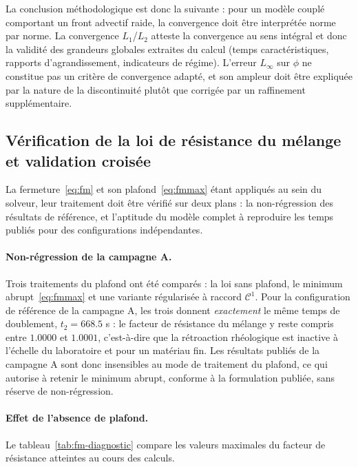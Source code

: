 \documentclass[11pt,a4paper]{report}
\begin{document}
La conclusion méthodologique est donc la suivante : pour un modèle couplé comportant un front advectif
raide, la convergence doit être interprétée norme par norme. La convergence \(L_1\)/\(L_2\) atteste la
convergence au sens intégral et donc la validité des grandeurs globales extraites du calcul (temps
caractéristiques, rapports d'agrandissement, indicateurs de régime). L'erreur \(L_\infty\) sur \(\phi\) ne
constitue pas un critère de convergence adapté, et son ampleur doit être expliquée par la nature de la
discontinuité plutôt que corrigée par un raffinement supplémentaire.

\subsection{Vérification de la loi de résistance du mélange et validation croisée}
\label{sec:verif-fm}

La fermeture~\eqref{eq:fm} et son plafond~\eqref{eq:fmmax} étant appliqués au sein du solveur, leur
traitement doit être vérifié sur deux plans : la non-régression des résultats de référence, et l'aptitude
du modèle complet à reproduire les temps publiés pour des configurations indépendantes.

\paragraph{Non-régression de la campagne A.} Trois traitements du plafond ont été comparés : la loi sans
plafond, le minimum abrupt~\eqref{eq:fmmax} et une variante régularisée à raccord \(\mathcal{C}^1\). Pour la
configuration de référence de la campagne A, les trois donnent \emph{exactement} le même temps de
doublement, \(t_2 = 668.5\) s : le facteur de résistance du mélange y reste compris entre \(1.0000\) et
\(1.0001\), c'est-à-dire que la rétroaction rhéologique est inactive à l'échelle du laboratoire et pour un
matériau fin. Les résultats publiés de la campagne A sont donc insensibles au mode de traitement du
plafond, ce qui autorise à retenir le minimum abrupt, conforme à la formulation publiée, sans réserve de
non-régression.

\paragraph{Effet de l'absence de plafond.} Le tableau~\ref{tab:fm-diagnostic} compare les valeurs
maximales du facteur de résistance atteintes au cours des calculs.
\end{document}
